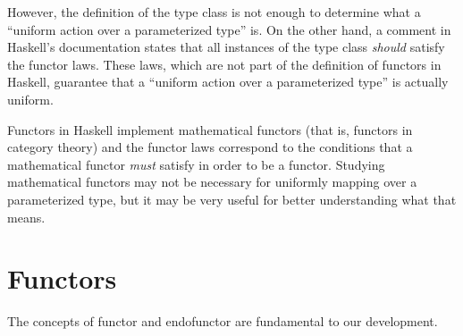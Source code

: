 However, the definition of the  type class is not
enough to determine what a ``uniform action over a parameterized
type'' is. On the other hand, a comment in Haskell's documentation
states that all instances of the  type class
\emph{should} satisfy the functor laws. These laws, which are not part
of the definition of functors in Haskell, guarantee that a ``uniform
action over a parameterized type'' is actually uniform.

Functors in Haskell implement mathematical functors (that is, functors
in category theory) and the functor laws correspond to the conditions
that a mathematical functor \emph{must} satisfy in order to be a
functor. Studying mathematical functors may not be necessary for
uniformly mapping over a parameterized type, but it may be very useful
for better understanding what that means.

\section{Functors}
\label{sec:functors}

The concepts of functor and endofunctor are fundamental to our
development.

